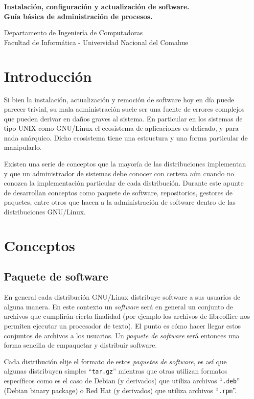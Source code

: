 \documentclass[12pt]{article}
\def\maketitle{

 \makeatletter
 {\color{bl} \centering \huge \sc \textbf{
  Instalación, configuración y actualización de software.\\ 
\large \vspace*{-8pt} \color{black} Guía básica de administración de procesos. 
 \vspace*{8pt} }\par}
 \makeatother

\makeatletter
 {\centering \small 
 	Departamento de Ingeniería de Computadoras \\
 	Facultad de Informática - Universidad Nacional del Comahue \\
 	\vspace{20pt} }
 \makeatother

}
\begin{document}
\thispagestyle{empty}
\maketitle
\setlength{\parindent}{0pt}

\section*{Introducción}

Si bien la instalación, actualización y remoción de software hoy en día
puede parecer trivial, su mala administración suele ser una fuente de 
errores complejos que pueden derivar en daños graves al sistema. 
En particular en los sistemas de tipo UNIX como GNU/Linux el ecosistema
de aplicaciones es delicado, y para nada anárquico. Dicho ecosistema tiene 
una estructura y una forma particular de manipularlo. 

Existen una serie de conceptos que la 
mayoría de las distribuciones implementan y que un administrador de 
sistemas debe conocer con certeza aún cuando no conozca la implementación
particular de cada distribución.  Durante este apunte de desarrollan
 conceptos como paquete de software, 
repositorios, gestores de paquetes, entre otros que hacen a la 
administración de software dentro de las distribuciones GNU/Linux.

\section*{Conceptos}

\subsection*{Paquete de software}

En general cada distribución GNU/Linux distribuye software a sus usuarios
de alguna manera. En este contexto un \textit{software} será en general un
conjunto de archivos que cumplirán cierta finalidad (por ejemplo los 
archivos de libreoffice nos permiten ejecutar un procesador de texto). El 
punto es cómo hacer llegar estos conjuntos de archivos a los usuarios. Un 
\textit{paquete de software} será entonces una forma sencilla de empaquetar
y distribuir software.

Cada distribución elije el formato de estos \textit{paquetes de software}, 
es así que algunas distribuyen simples ``\texttt{tar.gz}'' mientras que 
otras utilizan formatos específicos como es el caso de Debian (y derivados)
que utiliza archivos ``\texttt{.deb}'' (Debian binary package) o Red Hat 
(y derivados) que utiliza archivos ``\texttt{.rpm}''.
\end{document}
